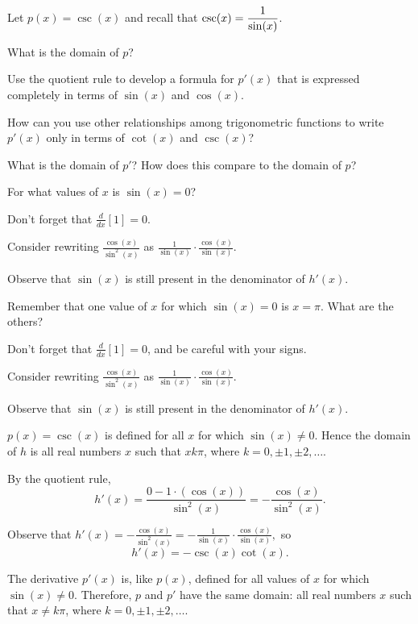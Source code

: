 \begin{activity} \label{A:2.5.6}  
Let $p(x) = \csc(x)$ and recall that $\displaystyle \csc(x) = \frac{1}{\sin(x)}$.
\ba
	\item What is the domain of $p$?
	\item Use the quotient rule to develop a formula for $p'(x)$ that is expressed completely in terms of $\sin(x)$ and $\cos(x)$.
	\item How can you use other relationships among trigonometric functions to write $p'(x)$ only in terms of $\cot(x)$ and $\csc(x)$?
	\item What is the domain of $p'$?  How does this compare to the domain of $p$? 
\ea
\end{activity}
\begin{smallhint}
\ba
	\item For what values of $x$ is $\sin(x) = 0$?
	\item Don't forget that $\frac{d}{dx}[1] = 0$.
	\item Consider rewriting $\frac{\cos(x)}{\sin^2(x)}$ as $\frac{1}{\sin(x)} \cdot \frac{\cos(x)}{\sin(x)}$.
	\item Observe that $\sin(x)$ is still present in the denominator of $h'(x)$. 
\ea
\end{smallhint}
\begin{bighint}
\ba
	\item Remember that one value of $x$ for which $\sin(x) = 0$ is $x = \pi$.  What are the others?
	\item Don't forget that $\frac{d}{dx}[1] = 0$, and be careful with your signs.
	\item Consider rewriting $\frac{\cos(x)}{\sin^2(x)}$ as $\frac{1}{\sin(x)} \cdot \frac{\cos(x)}{\sin(x)}$.
	\item Observe that $\sin(x)$ is still present in the denominator of $h'(x)$. 
\ea
\end{bighint}
\begin{activitySolution}
\ba
	\item $p(x) = \csc(x)$ is defined for all $x$ for which $\sin(x) \ne 0$.  Hence the domain of $h$ is all real numbers $x$ such that $x k\pi$, where $k = 0, \pm 1, \pm 2, \ldots$.
	\item By the quotient rule,
	$$h'(x) = \frac{0 - 1 \cdot (\cos(x))}{\sin^2(x)} = -\frac{\cos(x)}{\sin^2(x)}.$$
	\item Observe that $h'(x) = -\frac{\cos(x)}{\sin^2(x)} = -\frac{1}{\sin(x)} \cdot \frac{\cos(x)}{\sin(x)},$ so
	$$h'(x) = -\csc(x) \cot(x).$$
	\item The derivative $p'(x)$ is, like $p(x)$, defined for all values of $x$ for which $\sin(x) \ne 0$.  Therefore, $p$ and $p'$ have the same domain:  all real numbers $x$ such that $x \ne k\pi$, where $k = 0, \pm 1, \pm 2, \ldots$.
\ea
\end{activitySolution}
\aftera